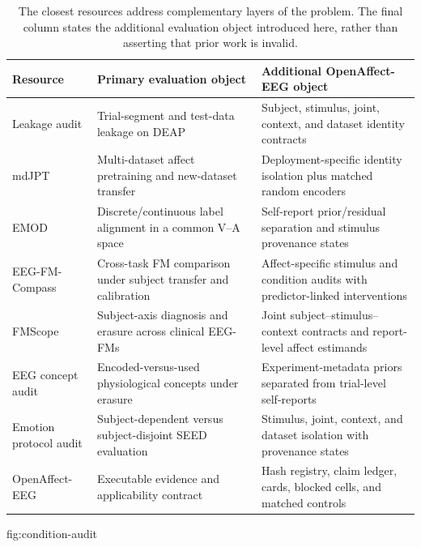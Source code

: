 \begin{table}[t]
  \caption{The closest resources address complementary layers of the problem.
  The final column states the additional evaluation object introduced here,
  rather than asserting that prior work is invalid.}
  \label{tab:related-benchmarks}
  \centering
  \small
  \begin{tabularx}{\linewidth}{@{}lXX@{}}
    \toprule
    Resource & Primary evaluation object & Additional OpenAffect-EEG object \\
    \midrule
    Leakage audit \citep{lei2025leakage} & Trial-segment and test-data leakage on DEAP & Subject, stimulus, joint, context, and dataset identity contracts \\
    mdJPT \citep{zhang2025mdjpt} & Multi-dataset affect pretraining and new-dataset transfer & Deployment-specific identity isolation plus matched random encoders \\
    EMOD \citep{chen2026emod} & Discrete/continuous label alignment in a common V--A space & Self-report prior/residual separation and stimulus provenance states \\
    EEG-FM-Compass \citep{liu2026compass} & Cross-task FM comparison under subject transfer and calibration & Affect-specific stimulus and condition audits with predictor-linked interventions \\
    FMScope \citep{lin2026identitytrap} & Subject-axis diagnosis and erasure across clinical EEG-FMs & Joint subject--stimulus--context contracts and report-level affect estimands \\
    EEG concept audit \citep{tang2026capture} & Encoded-versus-used physiological concepts under erasure & Experiment-metadata priors separated from trial-level self-reports \\
    Emotion protocol audit \citep{suo2026protocols} & Subject-dependent versus subject-disjoint SEED evaluation & Stimulus, joint, context, and dataset isolation with provenance states \\
    OpenAffect-EEG & Executable evidence and applicability contract & Hash registry, claim ledger, cards, blocked cells, and matched controls \\
    \bottomrule
  \end{tabularx}
\end{table}
{fig:condition-audit}

